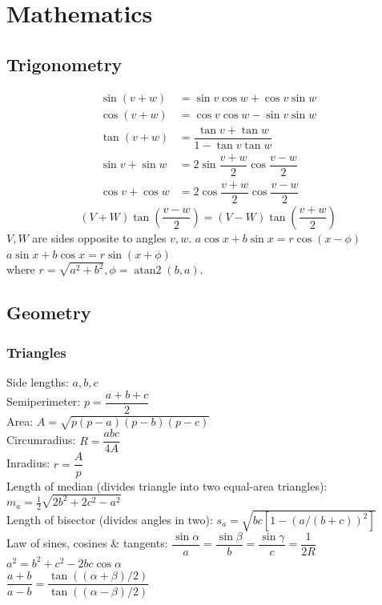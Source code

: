 \chapter{Mathematics}


\section{Trigonometry}
\vspace{-3mm}
\begin{align*}
\sin(v+w)&{}=\sin v\cos w+\cos v\sin w\\
\cos(v+w)&{}=\cos v\cos w-\sin v\sin w\\
\tan(v+w)&{}=\dfrac{\tan v+\tan w}{1-\tan v\tan w}\\
\sin v+\sin w&{}=2\sin\dfrac{v+w}{2}\cos\dfrac{v-w}{2}\\
\cos v+\cos w&{}=2\cos\dfrac{v+w}{2}\cos\dfrac{v-w}{2}
\end{align*}
\[ (V+W)\tan(\frac{v-w}{2}){}=(V-W)\tan(\frac{v+w}{2}) \]
$V, W$ are sides opposite to angles $v, w$.
	$a\cos x+b\sin x=r\cos(x-\phi)$\\
	$a\sin x+b\cos x=r\sin(x+\phi)$\\
where $r=\sqrt{a^2+b^2}, \phi=\operatorname{atan2}(b,a)$.

\section{Geometry}

\subsection{Triangles}
Side lengths: $a,b,c$\\
Semiperimeter: $p=\dfrac{a+b+c}{2}$\\
Area: $A=\sqrt{p(p-a)(p-b)(p-c)}$\\
Circumradius: $R=\dfrac{abc}{4A}$\\
Inradius: $r=\dfrac{A}{p}$\\
Length of median (divides triangle into two equal-area triangles): $m_a=\tfrac{1}{2}\sqrt{2b^2+2c^2-a^2}$\\
Length of bisector (divides angles in two): $s_a=\sqrt{bc\left[ 1 - (a / (b+c))^2 \right]}$\\
Law of sines, cosines \& tangents: $\dfrac{\sin\alpha}{a}=\dfrac{\sin\beta}{b}=\dfrac{\sin\gamma}{c}=\dfrac{1}{2R}$\\
$a^2=b^2+c^2-2bc\cos\alpha$\\
$\dfrac{a+b}{a-b}=\dfrac{\tan((\alpha + \beta)/2)}{\tan((\alpha - \beta)/2)}$
\vspace{4mm} %
